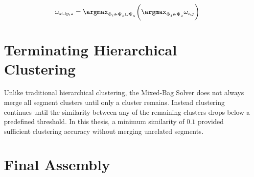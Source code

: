 \begin{equation} \label{eq:segmentClusterMerge}
	\omega_{x \cup y,z} = \argmax_{\Phi_i \in \Psi_x \cup \Psi_y} \bigg( \argmax_{\Phi_j \in \Psi_z} \omega_{i,j} \bigg) 
\end{equation}

\section{Terminating Hierarchical Clustering}

Unlike traditional hierarchical clustering, the Mixed-Bag Solver does not always merge all segment clusters  until only a cluster remains. Instead clustering continues until the similarity between any of the remaining clusters drops below a predefined threshold.  In this thesis, a minimum similarity of $0.1$ provided sufficient clustering accuracy without merging unrelated segments.

\section{Final Assembly}